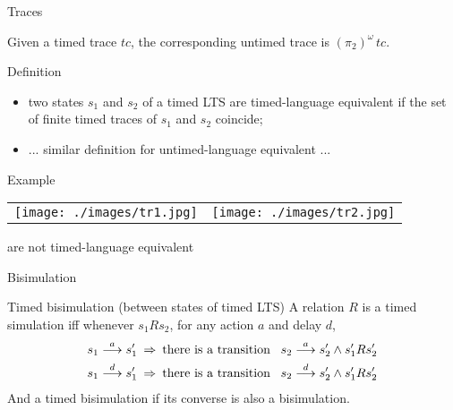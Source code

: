 \documentclass{beamer}
\def\dgold#1{{\darkgoldenrod #1}}
\def\dkb#1{{\blue #1}}
\begin{document}
\begin{slide}{Traces}
\small

Given a \dgold{timed trace} $tc$, the corresponding \dkb{untimed trace} is $(\pi_2)^{\omega}\,  tc$.

\begin{block}{Definition}
\begin{itemize}
\item two states $s_1$ and $s_2$ of a timed LTS are \dkb{timed-language equivalent} if the \dgold{set of finite timed traces}
of  $s_1$ and $s_2$ coincide;
\item ... similar definition for \dkb{untimed-language equivalent} ...
\end{itemize}
\end{block}

\begin{exampleblock}{Example}
\begin{tabular}{cc}
 \texttt{[image: ./images/tr1.jpg]} &   %
  \texttt{[image: ./images/tr2.jpg]}
\end{tabular}
are not \dkb{timed-language equivalent}
\\
\end{exampleblock}
\end{slide}

\begin{slide}{Bisimulation}
\small

\begin{block}{Timed bisimulation (between states of timed LTS)}
A relation $R$ is a \dkb{timed simulation} iff whenever $s_1 R s_2$, for any action $a$ and delay $d$,
\begin{align*}
s_1\stackrel{a}{\longrightarrow} s_1'\; & \mathbin{\Rightarrow}\; \text{there is a transition}\; \; \; s_2 \stackrel{a}{\longrightarrow} s_2' \mathbin{\wedge} s_1' R s_2'\\
s_1 \stackrel{d}{\longrightarrow} s_1'\; & \mathbin{\Rightarrow}\; \text{there is a transition}\; \; \; s_2 \stackrel{d}{\longrightarrow} s_2' \mathbin{\wedge} s_1' R s_2'
\end{align*}
And a \dkb{timed bisimulation} if its converse is also a bisimulation.
\end{block}
\end{slide}
\end{document}
